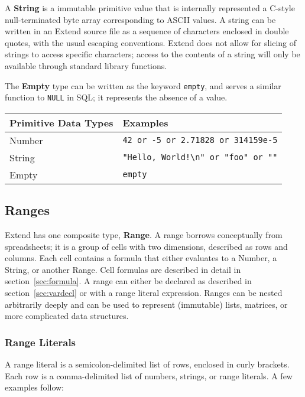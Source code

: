 		A \textbf{String} is a immutable primitive value that is internally represented a C-style null-terminated byte array corresponding to ASCII values. A string can be written in an Extend source file as a sequence of characters enclosed in double quotes, with the usual escaping conventions. Extend does not allow for slicing of strings to access specific characters; access to the contents of a string will only be available through standard library functions.

		The \textbf{Empty} type can be written as the keyword \texttt{empty}, and serves a similar function to \texttt{NULL} in SQL; it represents the absence of a value.
		\newline
		\begin{table}[H]
		\centering
		\begin{tabular} {| l | l |}
			\hline
			\textbf{Primitive Data Types} & \textbf{Examples} \\ \hline
			Number & \texttt{42 or -5 or 2.71828 or 314159e-5} \\ \hline
			String & \texttt{"Hello, World!\textbackslash n" or "foo" or ""} \\ \hline
			Empty & \texttt{empty} \\ \hline
		\end{tabular}
		\end{table}
	\subsection{Ranges}
		Extend has one composite type, \textbf{Range}. A range borrows conceptually from spreadsheets; it is a group of cells with two dimensions, described as rows and columns. Each cell contains a formula that either evaluates to a Number, a String, or another Range. Cell formulas are described in detail in section~\ref{sec:formula}. A range can either be declared as described in section~\ref{sec:vardecl} or with a range literal expression. Ranges can be nested arbitrarily deeply and can be used to represent (immutable) lists, matrices, or more complicated data structures.
\subsubsection{Range Literals}
		A range literal is a semicolon-delimited list of rows, enclosed in curly brackets. Each row is a comma-delimited list of numbers, strings, or range literals. A few examples follow:
		
